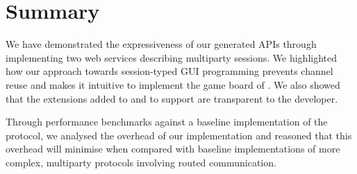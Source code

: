 



% 



\section{Summary}
We have demonstrated
the expressiveness of our generated APIs
through implementing two web services describing
multiparty sessions. We highlighted how our
approach towards session-typed GUI programming
prevents channel reuse and 
makes it intuitive to implement the game board
of .
We also showed
that the extensions added to \nodecodegen
and \reactcodegen
to support \newtheory
are transparent to the developer.

Through performance benchmarks against a
baseline implementation of the 
protocol, we analysed the overhead of our implementation
and reasoned that this overhead will minimise when compared
with baseline implementations of more complex, multiparty
protocols involving routed communication.